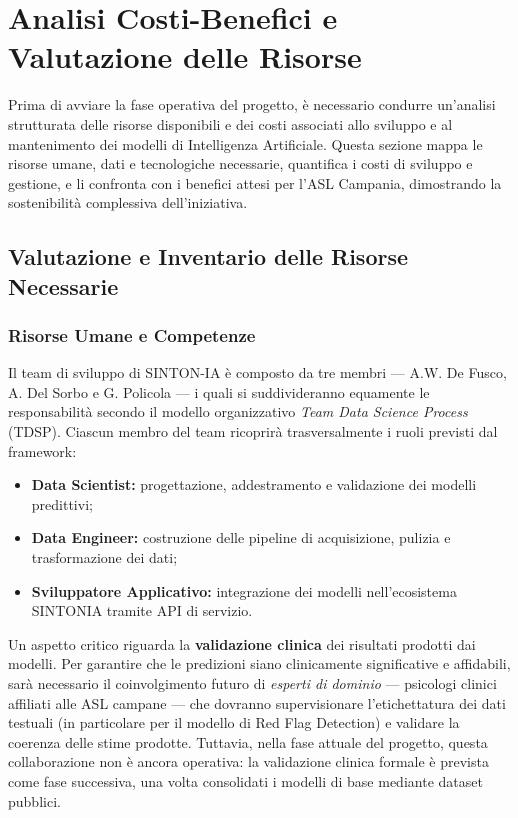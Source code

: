 \section{Analisi Costi-Benefici e Valutazione delle Risorse}
\label{sec:costi_benefici}

Prima di avviare la fase operativa del progetto, è necessario condurre un'analisi strutturata delle risorse disponibili e dei costi associati allo sviluppo e al mantenimento dei modelli di Intelligenza Artificiale. Questa sezione mappa le risorse umane, dati e tecnologiche necessarie, quantifica i costi di sviluppo e gestione, e li confronta con i benefici attesi per l'ASL Campania, dimostrando la sostenibilità complessiva dell'iniziativa.

\clearpage
\subsection{Valutazione e Inventario delle Risorse Necessarie}
\label{subsec:inventario_risorse}

\subsubsection{Risorse Umane e Competenze}
\label{subsubsec:risorse_umane}

Il team di sviluppo di SINTON-IA è composto da tre membri --- A.W. De Fusco, A. Del Sorbo e G. Policola --- i quali si suddivideranno equamente le responsabilità secondo il modello organizzativo \textit{Team Data Science Process} (TDSP). Ciascun membro del team ricoprirà trasversalmente i ruoli previsti dal framework:

\begin{itemize}
    \item \textbf{Data Scientist:} progettazione, addestramento e validazione dei modelli predittivi;
    \item \textbf{Data Engineer:} costruzione delle pipeline di acquisizione, pulizia e trasformazione dei dati;
    \item \textbf{Sviluppatore Applicativo:} integrazione dei modelli nell'ecosistema SINTONIA tramite API di servizio.
\end{itemize}

Un aspetto critico riguarda la \textbf{validazione clinica} dei risultati prodotti dai modelli. Per garantire che le predizioni siano clinicamente significative e affidabili, sarà necessario il coinvolgimento futuro di \textit{esperti di dominio} --- psicologi clinici affiliati alle ASL campane --- che dovranno supervisionare l'etichettatura dei dati testuali (in particolare per il modello di Red Flag Detection) e validare la coerenza delle stime prodotte. Tuttavia, nella fase attuale del progetto, questa collaborazione non è ancora operativa: la validazione clinica formale è prevista come fase successiva, una volta consolidati i modelli di base mediante dataset pubblici.

